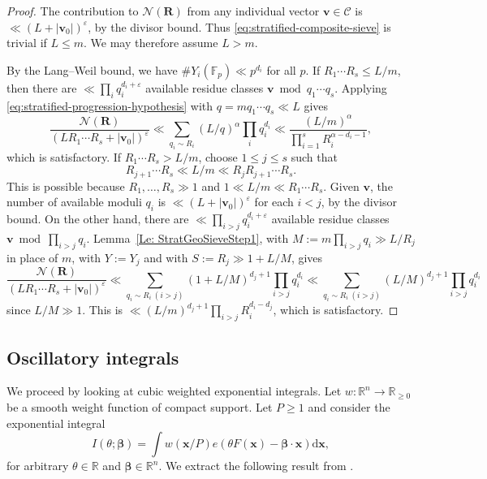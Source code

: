 \documentclass[a4paper,11pt, twoside,reqno]{amsart}
\theoremstyle{plain}
\theoremstyle{definition}
\theoremstyle{remark}
\newcommand{\bfv}{\bm{v}}
\newcommand{\bfx}{\bm{x}}
\newcommand{\RR}{\mathbb{R}}
\newcommand{\bfbe}{\boldsymbol{\beta}}
\newcommand{\ve}{\varepsilon}
\renewcommand{\le}{\leqslant}
\renewcommand{\geq}{\geqslant}
\newcommand{\FF}{\mathbb{F}}
\numberwithin{equation}{section}
\begin{document}
\begin{proof}
The contribution to $\mathcal N(\bm R)$
from any individual vector $\bfv\in\mathcal C$
is $\ll (L+|\bfv_0|)^\ve$,
by the divisor bound.
Thus \eqref{eq:stratified-composite-sieve} is trivial if $L \le m$.
We may therefore assume $L>m$.

By the Lang--Weil bound,
we have $\#Y_i(\FF_p) \ll p^{d_i}$ for all $p$.
If $R_1\cdots R_s\le L/m$,
then there are $\ll \prod_i q_i^{d_i+\ve}$
available residue classes $\bfv\bmod{q_1\cdots q_s}$.
Applying \eqref{eq:stratified-progression-hypothesis}
with $q = mq_1\cdots q_s \ll L$ gives
\begin{equation*}
\frac{\mathcal N(\bm R)}{(LR_1\cdots R_s + |\bfv_0|)^\ve}
\ll \sum_{q_i\sim R_i}
(L/q)^\alpha
\prod_i q_i^{d_i}
\ll \frac{(L/m)^\alpha}{\prod_{i=1}^s R_i^{\alpha-d_i-1}},
\end{equation*}
which is satisfactory.
If $R_1\cdots R_s > L/m$, choose $1\le j\le s$ such that
\[
R_{j+1}\cdots R_s \ll L/m \ll R_jR_{j+1}\cdots R_s.
\]
This is possible because $R_1,\dots,R_s \gg 1$ and $1 \ll L/m \ll R_1\cdots R_s$.
Given $\bfv$, the number of available moduli $q_i$
is $\ll (L+|\bfv_0|)^\ve$ for each $i<j$,
by the divisor bound.
On the other hand, there are $\ll \prod_{i>j} q_i^{d_i+\ve}$
available residue classes $\bfv\bmod{\prod_{i>j} q_i}$.
Lemma~\ref{Le: StratGeoSieveStep1},
with $M := m\prod_{i>j} q_i \gg L/R_j$ in place of $m$,
with $Y := Y_j$ and with $S := R_j \gg 1 + L/M$, gives
\begin{equation*}
\frac{\mathcal N(\bm R)}{(LR_1\cdots R_s + |\bfv_0|)^\ve}
\ll \sum_{q_i\sim R_i\ (i>j)} (1+L/M)^{d_j+1}
\prod_{i>j} q_i^{d_i}
\ll \sum_{q_i\sim R_i\ (i>j)} (L/M)^{d_j+1}
\prod_{i>j} q_i^{d_i}
\end{equation*}
since $L/M \gg 1$.
This is $\ll (L/m)^{d_j+1} \prod_{i>j} R_i^{d_i-d_j}$, which is satisfactory.
\end{proof}





\subsection{Oscillatory integrals}

We proceed by  looking at cubic  weighted exponential integrals. 
Let $w: \RR^n \rightarrow \RR_{\geq 0}$ be a smooth weight function
 of compact support.
Let $P\geq 1$ and 
consider the  exponential integral
\begin{equation}\label{eq:defIq}
 I(\theta;\bfbe)=\int w(\bfx/P)e(\theta F(\bfx)-\bfbe\cdot \bfx)\mathrm{d}\bfx,
\end{equation}
for arbitrary $\theta \in \RR$ and $\bfbe\in \RR^n.$ We extract the following result from \cite{41}.
\end{document}
